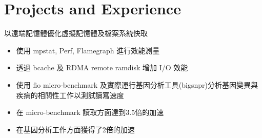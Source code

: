 \section{Projects and Experience}

{\begin{CJK*}{UTF8}{bsmi}以遠端記憶體優化虛擬記憶體及檔案系統快取\end{CJK*}}
{}
{}

\begin{itemize}
		\setlength\topsep{0em}
		\setlength\parskip{0em}
		\setlength\parsep{0em}
		\setlength\itemsep{0em}
    \item\begin{CJK*}{UTF8}{bsmi}使用 mpstat, Perf, Flamegraph 進行效能測量\end{CJK*} 
    \item\begin{CJK*}{UTF8}{bsmi}透過 bcache 及 RDMA remote ramdisk 增加 I/O 效能\end{CJK*} 
    \item\begin{CJK*}{UTF8}{bsmi}使用 fio micro-benchmark 及實際運行基因分析工具(bigsnpr)分析基因變異與疾病的相關性工作以測試讀寫速度\end{CJK*} 
    \item\begin{CJK*}{UTF8}{bsmi}在 micro-benchmark 讀取方面達到3.5倍的加速\end{CJK*} 
    \item\begin{CJK*}{UTF8}{bsmi}在基因分析工作方面獲得了2倍的加速\end{CJK*} 
\end{itemize}

